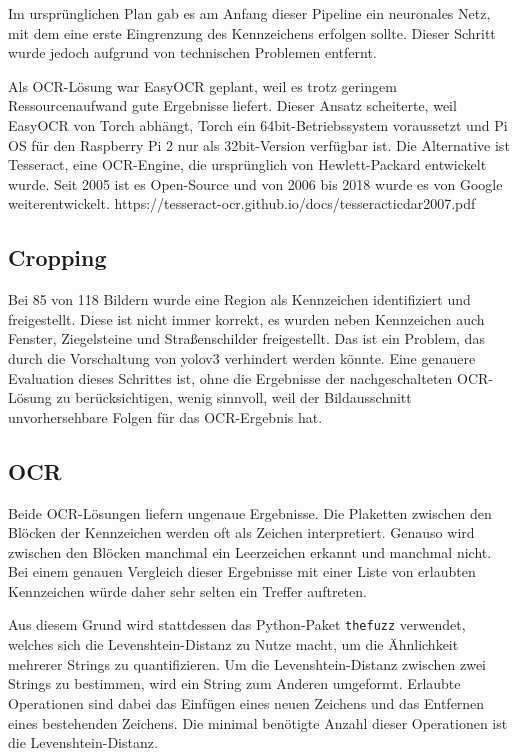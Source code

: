 Im ursprünglichen Plan gab es am Anfang dieser Pipeline ein neuronales Netz, mit dem eine erste Eingrenzung des Kennzeichens erfolgen sollte. Dieser Schritt wurde jedoch aufgrund von technischen Problemen entfernt.

Als OCR-Lösung war EasyOCR geplant, weil es trotz geringem Ressourcenaufwand gute Ergebnisse liefert. Dieser Ansatz scheiterte, weil EasyOCR von Torch abhängt, Torch ein 64bit-Betriebssystem voraussetzt und Pi OS für den Raspberry Pi 2 nur als 32bit-Version verfügbar ist.
Die Alternative ist Tesseract, eine OCR-Engine, die ursprünglich von Hewlett-Packard entwickelt wurde. Seit 2005 ist es Open-Source und von 2006 bis 2018 wurde es von Google weiterentwickelt. https://tesseract-ocr.github.io/docs/tesseracticdar2007.pdf

\subsection{Cropping}
Bei 85 von 118 Bildern wurde eine Region als Kennzeichen identifiziert und freigestellt.
Diese ist nicht immer korrekt, es wurden neben Kennzeichen auch Fenster, Ziegelsteine und Straßenschilder freigestellt.
Das ist ein Problem, das durch die Vorschaltung von yolov3 verhindert werden könnte. 
Eine genauere Evaluation dieses Schrittes ist, ohne die Ergebnisse der nachgeschalteten OCR-Lösung zu berücksichtigen, wenig sinnvoll, weil der Bildausschnitt unvorhersehbare Folgen für das OCR-Ergebnis hat.


\subsection{OCR}
Beide OCR-Lösungen liefern ungenaue Ergebnisse. Die Plaketten zwischen den Blöcken der Kennzeichen werden oft als Zeichen interpretiert. Genauso wird zwischen den Blöcken manchmal ein Leerzeichen erkannt und manchmal nicht.
Bei einem genauen Vergleich dieser Ergebnisse mit einer Liste von erlaubten Kennzeichen würde daher sehr selten ein Treffer auftreten.

Aus diesem Grund wird stattdessen das Python-Paket \lstinline{thefuzz} verwendet, welches sich die Levenshtein-Distanz zu Nutze macht, um die Ähnlichkeit mehrerer Strings zu quantifizieren.
Um die Levenshtein-Distanz zwischen zwei Strings zu bestimmen, wird ein String zum Anderen umgeformt. Erlaubte Operationen sind dabei das Einfügen eines neuen Zeichens und das Entfernen eines bestehenden Zeichens.
Die minimal benötigte Anzahl dieser Operationen ist die Levenshtein-Distanz.

